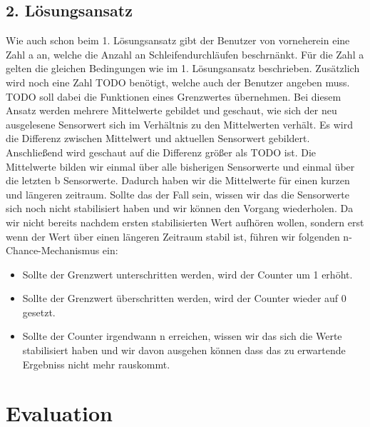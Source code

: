 \documentclass{article}
\begin{document}
    \subsection{2. Lösungsansatz}
    Wie auch schon beim 1. Lösungsansatz gibt der Benutzer von vorneherein eine Zahl a an, welche die Anzahl an Schleifendurchläufen beschrnänkt. Für die Zahl a gelten die gleichen Bedingungen wie im 1. Lösungsansatz beschrieben. 
    Zusätzlich wird noch eine Zahl TODO benötigt, welche auch der Benutzer angeben muss. TODO soll dabei die Funktionen eines Grenzwertes übernehmen.
    Bei diesem Ansatz werden mehrere Mittelwerte gebildet und geschaut, wie sich der neu ausgelesene Sensorwert sich im Verhältnis zu den Mittelwerten verhält. Es wird die Differenz zwischen Mittelwert und aktuellen Sensorwert gebildert. Anschließend wird geschaut auf die Differenz größer als TODO ist.
    Die Mittelwerte bilden wir einmal über alle bisherigen Sensorwerte und einmal über die letzten b Sensorwerte. Dadurch haben wir die Mittelwerte für einen kurzen und längeren zeitraum.
    Sollte das der Fall sein, wissen wir das die Sensorwerte sich noch nicht stabilisiert haben und wir können den Vorgang wiederholen. Da wir nicht bereits nachdem ersten stabilisierten Wert aufhören wollen, sondern erst wenn der Wert über einen längeren Zeitraum stabil ist, führen wir folgenden n-Chance-Mechanismus ein:
    \begin{itemize}
        \item Sollte der Grenzwert unterschritten werden, wird der Counter um 1 erhöht.
        \item Sollte der Grenzwert überschritten werden, wird der Counter wieder auf 0 gesetzt.
        \item Sollte der Counter irgendwann n erreichen, wissen wir das sich die Werte stabilisiert haben und wir davon ausgehen können dass das zu erwartende Ergebniss nicht mehr rauskommt.
    \end{itemize}
    \newpage
    \section{Evaluation}
    \label{Evaluation}
    \subsection{}
\end{document}
